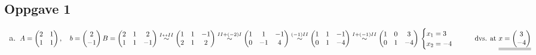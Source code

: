 \documentclass{article}
\newcommand{\uu}[1]{\underline{\underline{#1}}}
\newcommand{\eqto}[1]{\overset{#1}{\sim}}
\begin{document}
\subsection*{Oppgave 1}
\begin{enumerate}[a)]

    \item $A=\begin{pmatrix}
        2&1\\1&1
    \end{pmatrix},\quad b = \begin{pmatrix}
        2\\-1
    \end{pmatrix} 
    \\ \\ \\
    B=\begin{pmatrix}
        2&1&2\\1&1&-1
    \end{pmatrix}
    \eqto{I\leftrightarrow II}
    \begin{pmatrix}
        1&1&-1\\
        2&1&2
    \end{pmatrix}
    \eqto{II+(-2)I}
    \begin{pmatrix}
        1&1&-1\\
        0&-1&4
    \end{pmatrix}
    \eqto{(-1)II}
        \begin{pmatrix}
        1&1&-1\\
        0&1&-4
    \end{pmatrix}
    \eqto{I+(-1)II}
    \begin{pmatrix}
        1&0&3\\
        0&1&-4
    \end{pmatrix}
    \\ \\ \\
    \begin{cases}
       x_1 = 3 \\
       x_2 = -4
    \end{cases}
    \qquad
    \text{dvs. at } \uu{x = 
    \begin{pmatrix}
        3\\-4
    \end{pmatrix}}$
    
\vspace{4em}


\end{enumerate}
\end{document}
